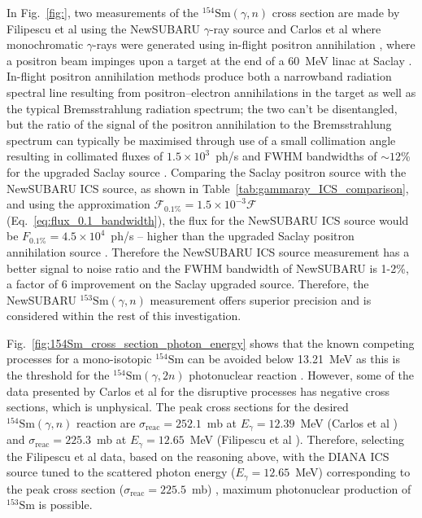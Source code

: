 \documentclass[../main.tex]{subfiles}
\begin{document}
In Fig.~\ref{fig:}, two measurements of the $^{154}\mathrm{Sm}\left(\gamma,n\right)$ cross section are made by Filipescu et al \cite{filipescu2014photoneutron} using the NewSUBARU $\gamma$-ray source \cite{utsunomiya2015gamma} and Carlos et al \cite{carlos1974giant} where monochromatic $\gamma$-rays were generated using in-flight positron annihilation \cite{miller1960monochromatic}, where a positron beam impinges upon a target at the end of a 60~\si{\mega\electronvolt} linac at Saclay \cite{audit1970etude}. In-flight positron annihilation methods produce both a narrowband radiation spectral line resulting from positron--electron annihilations in the target as well as the typical Bremsstrahlung radiation spectrum; the two can't be disentangled, but the ratio of the signal of the positron annihilation to the Bremsstrahlung spectrum can typically be maximised through use of a small collimation angle resulting in collimated fluxes of $1.5\times10^{3}$~ph/\si{\second} and FWHM bandwidths of $\sim 12$\% for the upgraded Saclay source \cite{veyssiere1979quasi}. Comparing the Saclay positron source with the NewSUBARU ICS source, as shown in Table~\ref{tab:gammaray_ICS_comparison}, and using the approximation $\mathcal{F}_{\mathrm{0.1\%}} = 1.5\times 10^{-3}\mathcal{F}$ \cite{krafft2010compton} (Eq.~\ref{eq:flux_0.1_bandwidth}), the flux for the NewSUBARU ICS source would be $F_{0.1\%}=4.5\times 10^{4}$~ph/\si{\second} -- higher than the upgraded Saclay positron annihilation source \cite{veyssiere1979quasi}. Therefore the NewSUBARU ICS source measurement has a better signal to noise ratio and the FWHM bandwidth of NewSUBARU is 1-2\%, a factor of 6 improvement on the Saclay upgraded source. Therefore, the NewSUBARU $^{153}\mathrm{Sm}\left(\gamma,n\right)$ measurement offers superior precision and is considered within the rest of this investigation.  

Fig.~\ref{fig:154Sm_cross_section_photon_energy} shows that the known competing processes for a mono-isotopic $^{154}\mathrm{Sm}$ can be avoided below 13.21~\si{\mega\electronvolt} as this is the threshold for the $^{154}\mathrm{Sm}\left(\gamma,2n\right)$ photonuclear reaction \cite{carlos1974giant}. However, some of the data presented by Carlos et al \cite{carlos1974giant} for the disruptive processes has negative cross sections, which is unphysical. The peak cross sections for the desired $^{154}\mathrm{Sm}\left(\gamma,n\right)$ reaction are $\sigma_{\mathrm{reac}} = 252.1$~\si{\milli\barn} at $E_{\gamma} = 12.39$~\si{\mega\electronvolt} (Carlos et al \cite{carlos1974giant}) and $\sigma_{\mathrm{reac}} = 225.3$~\si{\milli\barn} at $E_{\gamma} = 12.65$~\si{\mega\electronvolt} (Filipescu et al \cite{filipescu2014photoneutron}). Therefore, selecting the Filipescu et al \cite{filipescu2014photoneutron} data, based on the reasoning above, with the DIANA ICS source tuned to the scattered photon energy ($E_{\gamma}=12.65$~\si{\mega\electronvolt}) corresponding to the peak cross section ($\sigma_{\mathrm{reac}}=225.5$~\si{\milli\barn}) , maximum photonuclear production of $^{153}\mathrm{Sm}$ is possible.
\end{document}
